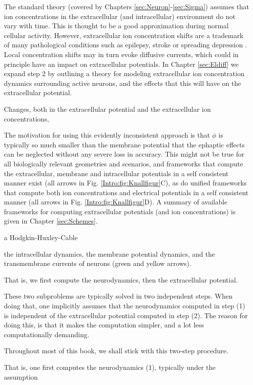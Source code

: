 The standard theory (covered by Chapters \ref{sec:Neuron}-\ref{sec:Sigma}) assumes that ion concentrations in the extracellular (and intracellular) environment do not vary with time. This is thought to be a good approximation during normal cellular activity. However, extracellular ion concentration shifts are a trademark of many pathological conditions such as epilepsy, stroke or spreading depression \cite{Somjen2001, Frohlich2008, Zandt2015review, Ayata2015}. Local concentration shifts may in turn evoke diffusive currents, which could in principle have an impact on extracellular potentials. In Chapter \ref{sec:Eldiff} we expand step 2 by outlining a theory for modeling extracellular ion concentration dynamics surrounding active neurons, and the effects that this will have on the extracellular potential. 

Changes, both in the extracellular potential and the extracellular ion concentrations, 

The motivation for using this evidently inconsistent approach is that $\phi$ is typically so much smaller than the membrane potential that the ephaptic effects can be neglected without any severe loss in accuracy. This might not be true for all biologically relevant geometries and scenarios, and frameworks that compute the extracellular, membrane and intracellular potentials in a self consistent manner exist (all arrows in Fig. \ref{Intro:fig:Knallfigur}C), as do unified frameworks that compute both ion concentrations and electrical potentials in a self consistent manner (all arrows in Fig. \ref{Intro:fig:Knallfigur}D). A summary of available frameworks for computing extracellular potentials (and ion concentrations) is given in Chapter \ref{sec:Schemes}.



a Hodgkin-Huxley-Cable


the intracellular dynamics, the membrane potential dynamics, and the transmembrane currents of neurons (green and yellow arrows).

That is, we first compute the neurodynamics, then the extracellular potential. 


These two subproblems are typically solved in two independent steps. When doing that, one implicitly assumes that the neurodynamics computed in step (1) is independent of the extracellular potential computed in step (2). The reason for doing this, is that it makes the computation simpler, and a lot less computationally demanding. 


Throughout most of this book, we shall stick with this two-step procedure. 







That is, one first computes the neurodynamics (1), typically under the assumption 